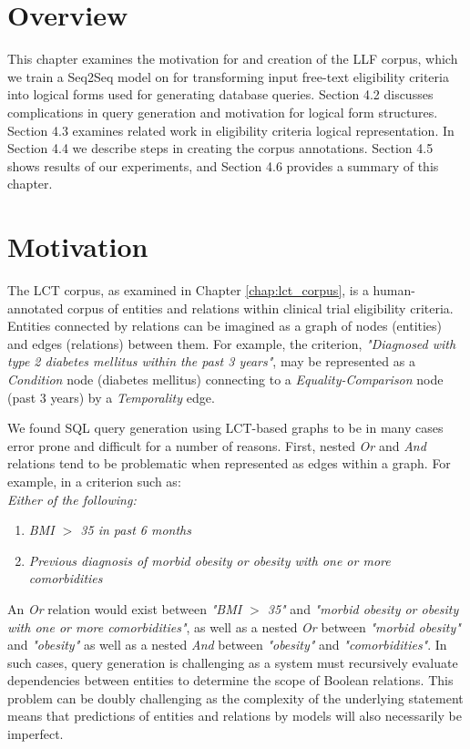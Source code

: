 \documentclass[../main.tex]{subfiles}
\begin{document}
\section{Overview}

This chapter examines the motivation for and creation of the LLF corpus, which we train a Seq2Seq model on for transforming input free-text eligibility criteria into logical forms used for generating database queries. Section 4.2 discusses complications in query generation and motivation for logical form structures. Section 4.3 examines related work in eligibility criteria logical representation. In Section 4.4 we describe steps in creating the corpus annotations. Section 4.5 shows results of our experiments, and Section 4.6 provides a summary of this chapter.

\section{Motivation}

The LCT corpus, as examined in Chapter \ref{chap:lct_corpus}, is a human-annotated corpus of entities and relations within clinical trial eligibility criteria. Entities connected by relations can be imagined as a graph of nodes (entities) and edges (relations) between them. For example, the criterion, \textit{"Diagnosed with type 2 diabetes mellitus within the past 3 years"}, may be represented as a \textit{Condition} node (diabetes mellitus) connecting to a \textit{Equality-Comparison} node (past 3 years) by a \textit{Temporality} edge.

We found SQL query generation using LCT-based graphs to be in many cases error prone and difficult for a number of reasons. First, nested \textit{Or} and \textit{And} relations tend to be problematic when represented as edges within a graph. For example, in a criterion such as: \\

\textit{Either of the following:}
\begin{enumerate}
    \itemsep0em 
    \item \textit{BMI $>$ 35 in past 6 months}
    \item \textit{Previous diagnosis of morbid obesity or obesity with one or more comorbidities}
\end{enumerate}

\noindent An \textit{Or} relation would exist between \textit{"BMI $>$ 35"} and \textit{"morbid obesity or obesity with one or more comorbidities"}, as well as a nested \textit{Or} between \textit{"morbid obesity"} and \textit{"obesity"} as well as a nested \textit{And} between \textit{"obesity"} and \textit{"comorbidities"}. In such cases, query generation is challenging as a system must recursively evaluate dependencies between entities to determine the scope of Boolean relations. This problem can be doubly challenging as the complexity of the underlying statement means that predictions of entities and relations by models will also necessarily be imperfect.
\end{document}
